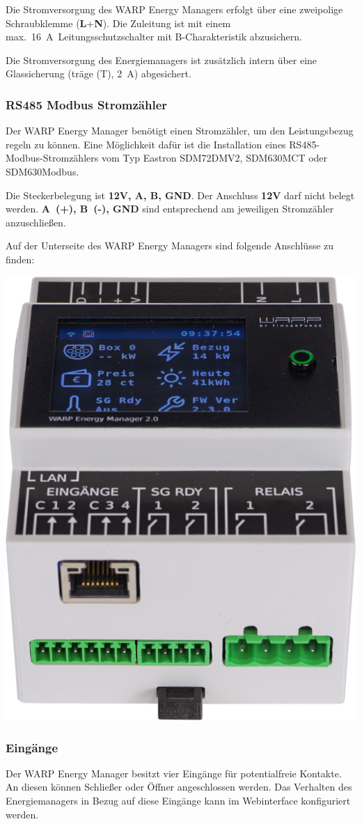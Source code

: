 \documentclass[a4paper,10pt]{article}
\begin{document}
\begin{multicols*}{2}
	Die Stromversorgung des WARP Energy Managers erfolgt über eine zweipolige
	Schraubklemme (\textbf{L}+\textbf{N}). Die Zuleitung ist mit einem
	max.~\SI{16}{\ampere}~Leitungsschutzschalter mit B-Charakteristik abzusichern.

	Die Stromversorgung des Energiemanagers ist zusätzlich intern über eine Glassicherung
	(träge (T), \SI{2}{\ampere}) abgesichert.
    
    
    \subsubsection{RS485 Modbus Stromzähler}

	Der WARP Energy Manager benötigt einen Stromzähler, um den Leistungsbezug regeln zu
	können. Eine Möglichkeit dafür ist die Installation eines RS485-Modbus-Stromzählers vom Typ Eastron SDM72DMV2, SDM630MCT oder SDM630Modbus.

	Die Steckerbelegung ist \textbf{12V, A, B, GND}. Der Anschluss \textbf{12V}
	darf nicht belegt werden. \textbf{A~(+), B~(-), GND} sind entsprechend
	am jeweiligen Stromzähler anzuschließen.
    
    \vspace{2cm}
    
    Auf der Unterseite des WARP Energy Managers sind folgende Anschlüsse zu finden:
    \begin{center}
        \includegraphics[width=0.5\linewidth]{./img_v2/wem2-connections-bottom.png}
    \end{center}
    
    
    
    \subsubsection{Eingänge}
	Der WARP Energy Manager besitzt vier Eingänge für potentialfreie Kontakte.
	An diesen können Schließer oder Öffner angeschlossen werden. Das Verhalten des
	Energiemanagers in Bezug auf diese Eingänge kann im Webinterface konfiguriert werden.


\end{multicols*}
\end{document}
